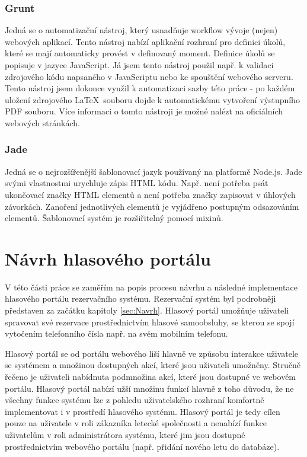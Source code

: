 \documentclass[ing,male,java,dept460]{diploma}						%
\begin{document}
\subsubsection{Grunt}
Jedná se o automatizační nástroj, který usnadňuje workflow vývoje (nejen) webových aplikací. Tento nástroj nabízí aplikační rozhraní pro definici úkolů, které se mají automaticky provést v definovaný moment. Definice úkolů se popisuje v jazyce JavaScript. Já jsem tento nástroj použil např. k validaci zdrojového kódu napsaného v JavaScriptu nebo ke spouštění webového serveru. Tento nástroj jsem dokonce využil k automatizaci sazby této práce - po každém uložení zdrojového \LaTeX\ souboru dojde k automatickému vytvoření výstupního PDF souboru. Více informaci o tomto nástroji je možné nalézt na oficiálních webových stránkách\cite{grunt}.

\subsubsection{Jade}
Jedná se o nejrozšířenější šablonovací jazyk používaný na platformě Node.js. Jade svými vlastnostmi urychluje zápis HTML kódu. Např. není potřeba psát ukončovací značky HTML elementů a není potřeba značky zapisovat v úhlových závorkách. Zanoření jednotlivých elementů je vyjádřeno postupným odsazováním elementů. Šablonovací systém je rozšiřitelný pomocí mixinů.

\section{Návrh hlasového portálu}
\label{sec:Navrh_hlasoveho_portalu}
V této části práce se zaměřím na popis procesu návrhu a následné implementace hlasového portálu rezervačního systému. Rezervační systém byl podrobněji představen za začátku kapitoly \ref{sec:Navrh}. Hlasový portál umožňuje uživateli spravovat své rezervace prostřednictvím hlasové samoobsluhy, se kterou se spojí vytočením telefonního čísla např. na svém mobilním telefonu.

Hlasový portál se od portálu webového liší hlavně ve způsobu interakce uživatele se systémem a množinou dostupných akcí, které jsou uživateli umožněny. Stručně řečeno je uživateli nabídnuta podmnožina akcí, které jsou dostupné ve webovém portálu. Hlasový portál nabízí užší množinu funkcí hlavně z toho důvodu, že ne všechny funkce systému lze z pohledu uživatelského rozhraní komfortně implementovat i v prostředí hlasového systému. Hlasový portál je tedy cílen pouze na uživatele v roli zákazníka letecké společnosti a nenabízí funkce uživatelům v roli administrátora systému, které jim jsou dostupné prostřednictvím webového portálu (např. přidání nového letu do databáze).
\end{document}
